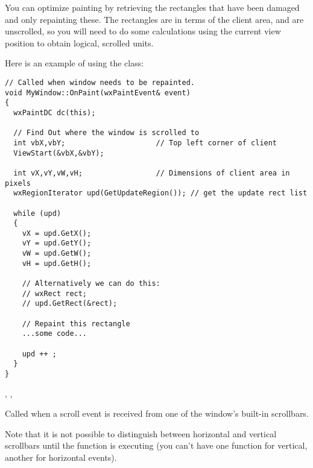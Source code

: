 You can optimize painting by retrieving the rectangles
that have been damaged and only repainting these. The rectangles are in
terms of the client area, and are unscrolled, so you will need to do
some calculations using the current view position to obtain logical,
scrolled units.

Here is an example of using the  class:

{\small%
\begin{verbatim}
// Called when window needs to be repainted.
void MyWindow::OnPaint(wxPaintEvent& event)
{
  wxPaintDC dc(this);

  // Find Out where the window is scrolled to
  int vbX,vbY;                     // Top left corner of client
  ViewStart(&vbX,&vbY);

  int vX,vY,vW,vH;                 // Dimensions of client area in pixels
  wxRegionIterator upd(GetUpdateRegion()); // get the update rect list

  while (upd)
  {
    vX = upd.GetX();
    vY = upd.GetY();
    vW = upd.GetW();
    vH = upd.GetH();

    // Alternatively we can do this:
    // wxRect rect;
    // upd.GetRect(&rect);

    // Repaint this rectangle
    ...some code...

    upd ++ ;
  }
}
\end{verbatim}
}%


,\rtfsp
{},\rtfsp
{}


Called when a scroll event is received from one of the window's built-in scrollbars.




Note that it is not possible to distinguish between horizontal and vertical scrollbars
until the function is executing (you can't have one function for vertical, another
for horizontal events).

